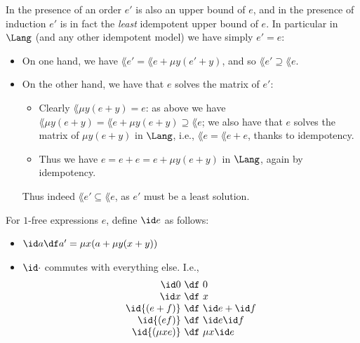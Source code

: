 \documentclass[runningheads]{amsart}
\begin{document}
In the presence of an order $e'$ is also an upper bound of $e$, and in the presence of induction $e'$ is in fact the \emph{least} idempotent upper bound of $e$.
In particular in $\Lang $ (and any other idempotent model) we have simply $e'=e$:
\begin{itemize}
    \item On one hand, we have $\lang {e'} = \lang{e + \mu y (e'+y)}$, and so $\lang {e'} \supseteq \lang e$.
    \item On the other hand, we have that $e$ solves the matrix of $e'$:
    \begin{itemize}
        \item Clearly $\lang {\mu y (e+y)} = e$: as above we have $\lang {\mu y (e+y)} = \lang{e + \mu y (e+y)} \supseteq \lang e$; we also have that $e$ solves the matrix of $\mu y (e+y)$ in $\Lang$, i.e., $\lang e = \lang {e+e}$, thanks to idempotency.
        \item Thus we have $e = e + e = e + \mu y (e+y)$ in $\Lang$, again by idempotency.
    \end{itemize}
    Thus indeed $\lang {e'}\subseteq \lang e$, as $e'$ must be a least solution.
\end{itemize}

\begin{definition}
    For $1$-free expressions $e$, define $\id e $ as follows:
\begin{itemize}
    \item $\id a \df a' = \mu x (a + \mu y (x+y))$
    \item $\id \cdot $ commutes with everything else. I.e.,
    \[
    \begin{array}{r@{\ \df\ }l}
         \id 0 & 0 \\
         \id x & x \\
         \id {(e+f)} & \id e + \id f \\
         \id {(ef)} & \id e \id f \\
         \id{(\mu x e)} & \mu x \id e
    \end{array}
    \]
\end{itemize}
\end{definition}
\end{document}

